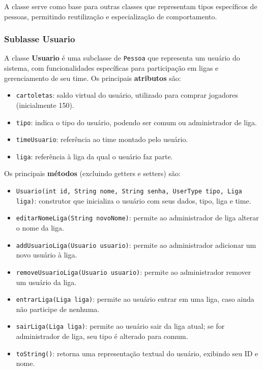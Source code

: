 \documentclass[12pt]{article}
\begin{document}
A classe serve como base para outras classes que representam tipos específicos de pessoas, permitindo reutilização e especialização de comportamento.

\subsubsection{Sublasse Usuario}

A classe \textbf{Usuario} é uma subclasse de \texttt{Pessoa} que representa um usuário do sistema, com funcionalidades específicas para participação em ligas e gerenciamento de seu time. Os principais \textbf{atributos} são:

\begin{itemize}
  \item \texttt{cartoletas}: saldo virtual do usuário, utilizado para comprar jogadores (inicialmente 150).
  \item \texttt{tipo}: indica o tipo do usuário, podendo ser comum ou administrador de liga.
  \item \texttt{timeUsuario}: referência ao time montado pelo usuário.
  \item \texttt{liga}: referência à liga da qual o usuário faz parte.
\end{itemize}

Os principais \textbf{métodos} (excluindo getters e setters) são:

\begin{itemize}
  \item \texttt{Usuario(int id, String nome, String senha, UserType tipo, Liga liga)}: construtor que inicializa o usuário com seus dados, tipo, liga e time.
  \item \texttt{editarNomeLiga(String novoNome)}: permite ao administrador de liga alterar o nome da liga.
  \item \texttt{addUsuarioLiga(Usuario usuario)}: permite ao administrador adicionar um novo usuário à liga.
  \item \texttt{removeUsuarioLiga(Usuario usuario)}: permite ao administrador remover um usuário da liga.
  \item \texttt{entrarLiga(Liga liga)}: permite ao usuário entrar em uma liga, caso ainda não participe de nenhuma.
  \item \texttt{sairLiga(Liga liga)}: permite ao usuário sair da liga atual; se for administrador de liga, seu tipo é alterado para comum.
  \item \texttt{toString()}: retorna uma representação textual do usuário, exibindo seu ID e nome.
\end{itemize}
\end{document}
